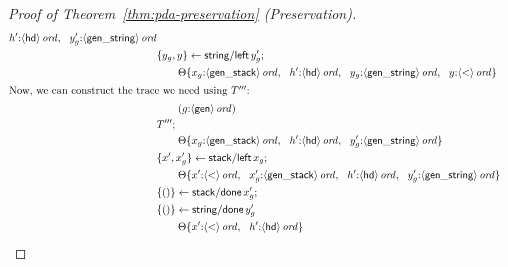 \begin{proof}[Proof of Theorem~\ref{thm:pda-preservation} (Preservation)]
\begin{align*}
{                   h'{:}{\langle {\sf hd} \rangle}\,{{\it ord}}, ~~
                   y_g'{:}{\langle {\sf gen\_string} \rangle}\,{{\it ord}}}\\
& \{{y_g,y}\} \leftarrow {{\sf string/left}\,y_g'};\\
& \qquad {\Theta}\{{
                   x_g{:}{\langle {\sf gen\_stack} \rangle}\,{{\it ord}}, ~~
                   h'{:}{\langle {\sf hd} \rangle}\,{{\it ord}}, ~~
                   y_g{:}{\langle {\sf gen\_string} \rangle}\,{{\it ord}}, ~~
                   y{:}{\langle {\sf <} \rangle}\,{{\it ord}}}\}\\
\intertext{Now, we can construct the trace we need using $T'''$:}
& \qquad 
({g{:}{\langle {\sf gen} \rangle}\,{{\it ord}}})\\
& T''';\\
& \qquad {\Theta}\{{
                   x_g{:}{\langle {\sf gen\_stack} \rangle}\,{{\it ord}}, ~~
                   h'{:}{\langle {\sf hd} \rangle}\,{{\it ord}}, ~~
                   y_g'{:}{\langle {\sf gen\_string} \rangle}\,{{\it ord}}}\}\\
& \{{x', x_g'}\} \leftarrow {{\sf stack/left}\,x_g};\\
& \qquad {\Theta}\{{
                   x'{:}{\langle {\sf <} \rangle}\,{{\it ord}}, ~~
                   x_g'{:}{\langle {\sf gen\_stack} \rangle}\,{{\it ord}}, ~~
                   h'{:}{\langle {\sf hd} \rangle}\,{{\it ord}}, ~~
                   y_g'{:}{\langle {\sf gen\_string} \rangle}\,{{\it ord}}}\}\\
& \{{()}\} \leftarrow {{\sf stack/done}\,x_g'};\\
& \{{()}\} \leftarrow {{\sf string/done}\,y_g'}\\
& \qquad {\Theta}\{{
                   x'{:}{\langle {\sf <} \rangle}\,{{\it ord}}, ~~
                   h'{:}{\langle {\sf hd} \rangle}\,{{\it ord}}}\}
\end{align*}


\end{proof}

